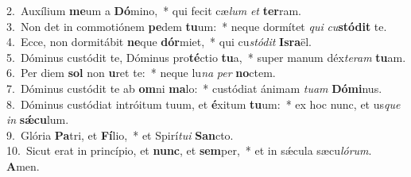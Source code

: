 {2.~}Auxílium \textbf{me}um a \textbf{Dó}mino,~* qui fecit cæ\textit{lum} \textit{et} \textbf{ter}ram.\\
{3.~}Non det in commotiónem \textbf{pe}dem \textbf{tu}um:~* neque dormítet \textit{qui} \textit{cu}\textbf{stó}\textbf{dit} te.\\
{4.~}Ecce, non dormitábit \textbf{ne}que \textbf{dór}miet,~* qui cu\textit{stó}\textit{dit} \textbf{Is}\textbf{ra}ël.\\
{5.~}Dóminus custódit te, Dóminus pro\textbf{té}ctio \textbf{tu}a,~* super manum déx\textit{te}\textit{ram} \textbf{tu}am.\\
{6.~}Per diem \textbf{sol} non \textbf{u}ret te:~* neque lu\textit{na} \textit{per} \textbf{no}ctem.\\
{7.~}Dóminus custódit te ab \textbf{om}ni \textbf{ma}lo:~* custódiat ánimam \textit{tu}\textit{am} \textbf{Dó}\textbf{mi}nus.\\
{8.~}Dóminus custódiat intróitum tuum, et \textbf{é}xitum \textbf{tu}um:~* ex hoc nunc, et us\textit{que} \textit{in} \textbf{sǽ}\textbf{cu}lum.\\
{9.~}Glória \textbf{Pa}tri, et \textbf{Fí}lio,~* et Spirí\textit{tu}\textit{i} \textbf{San}cto.\\
{10.~}Sicut erat in princípio, et \textbf{nunc}, et \textbf{sem}per,~* et in sǽcula sæcu\textit{ló}\textit{rum}. \textbf{A}men.\\
